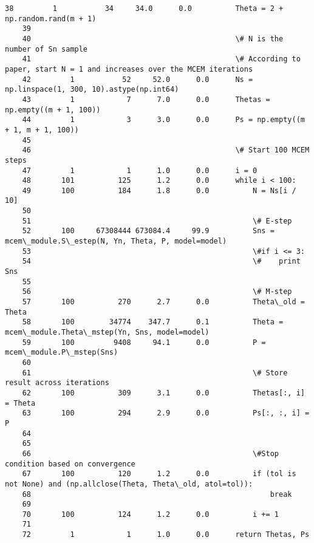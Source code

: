 \documentclass{article}
\begin{document}
\begin{Verbatim}[commandchars=\\\{\}]
    38         1           34     34.0      0.0          Theta = 2 + np.random.rand(m + 1)
    39                                           
    40                                               \# N is the number of Sn sample
    41                                               \# According to paper, start N = 1 and increases over the MCEM iterations
    42         1           52     52.0      0.0      Ns = np.linspace(1, 300, 10).astype(np.int64)
    43         1            7      7.0      0.0      Thetas = np.empty((m + 1, 100))
    44         1            3      3.0      0.0      Ps = np.empty((m + 1, m + 1, 100))
    45                                           
    46                                               \# Start 100 MCEM steps
    47         1            1      1.0      0.0      i = 0
    48       101          125      1.2      0.0      while i < 100:
    49       100          184      1.8      0.0          N = Ns[i / 10]
    50                                           
    51                                                   \# E-step
    52       100     67308444 673084.4     99.9          Sns = mcem\_module.S\_estep(N, Yn, Theta, P, model=model)
    53                                                   \#if i <= 3:
    54                                                   \#    print Sns
    55                                           
    56                                                   \# M-step
    57       100          270      2.7      0.0          Theta\_old = Theta
    58       100        34774    347.7      0.1          Theta = mcem\_module.Theta\_mstep(Yn, Sns, model=model)
    59       100         9408     94.1      0.0          P = mcem\_module.P\_mstep(Sns)
    60                                           
    61                                                   \# Store result across iterations
    62       100          309      3.1      0.0          Thetas[:, i] = Theta
    63       100          294      2.9      0.0          Ps[:, :, i] = P
    64                                           
    65                                                   
    66                                                   \#Stop condition based on convergence
    67       100          120      1.2      0.0          if (tol is not None) and (np.allclose(Theta, Theta\_old, atol=tol)):
    68                                                       break
    69                                           
    70       100          124      1.2      0.0          i += 1
    71                                           
    72         1            1      1.0      0.0      return Thetas, Ps
    \end{Verbatim}
\end{document}
